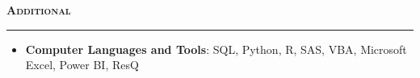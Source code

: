 \documentclass[11pt,letterpaper]{article}
\newcommand{\sectline}{\vspace{5pt}\hrule height 1.5pt\vspace{5pt}}
\newcommand{\sectspace}{\vspace{9pt}}
\newcommand{\smallspace}{\vspace{6pt}}
\newcommand{\heading}[1]{{\fontsize{12pt}{13pt} {\textbf{\textsc{#1}}}}}
\begin{document}


\heading{Additional}\sectline
\begin{itemize}
	\item \textbf{Computer Languages and Tools}: SQL, Python, R, SAS, VBA, Microsoft Excel, Power BI, ResQ
\end{itemize}
\end{document}
